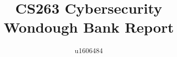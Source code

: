 \documentclass{article}
\title{
    CS263 Cybersecurity \\
    Wondough Bank Report
}
\author{u1606484}
\begin{document}
\maketitle





\cite{bbcPhone}



\end{document}
